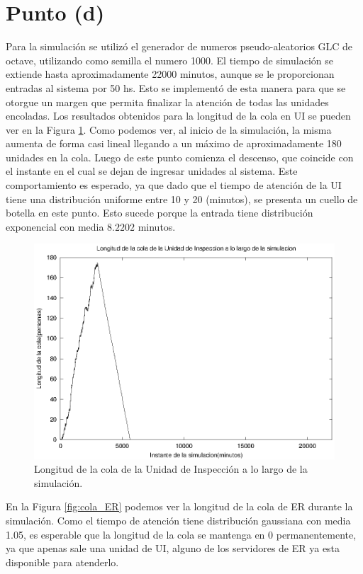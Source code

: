 \documentclass[a4paper,10pt]{article}
\begin{document}
\section{Punto (d)}
Para la simulación se utilizó el generador de numeros pseudo-aleatorios GLC de octave, utilizando como semilla el numero 1000. El tiempo de simulación se extiende hasta aproximadamente 22000 minutos, aunque se le proporcionan entradas al sistema por 50 hs. Esto se implementó de esta manera para que se otorgue un margen que permita finalizar la atención de todas las unidades encoladas. Los resultados obtenidos para la longitud de la cola en UI se pueden ver en la Figura \ref{fig:cola_UI}. Como podemos ver, al inicio de la simulación, la misma aumenta de forma casi lineal llegando a un máximo de aproximadamente 180 unidades en la cola. Luego de este punto comienza el descenso, que coincide con el instante en el cual se dejan de ingresar unidades al sistema. Este comportamiento es esperado, ya que dado que el tiempo de atención de la UI tiene una distribución uniforme entre 10 y 20 (minutos), se presenta un cuello de botella en este punto. Esto sucede porque la entrada tiene distribución exponencial con media $8.2202$ minutos.\\
\begin{figure}[ht]
\begin{center}
\includegraphics[width=15cm]{./img/cola_UI.eps}
\caption{\label{fig:cola_UI} Longitud de la cola de la Unidad de Inspecci\'on a lo largo de la simulaci\'on.}
\end{center}
\end{figure}
En la Figura \ref{fig:cola_ER} podemos ver la longitud de la cola de ER durante la simulación. Como el tiempo de atención tiene distribución gaussiana con media 1.05, es esperable que la longitud de la cola se mantenga en 0 permanentemente, ya que apenas sale una unidad de UI, alguno de los servidores de ER ya esta disponible para atenderlo.\\
\end{document}
